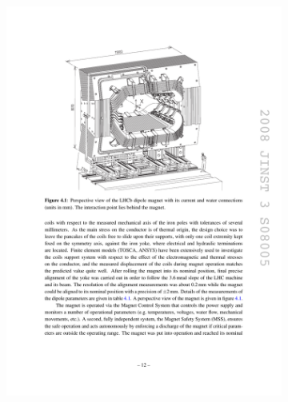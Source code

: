 \begin{figure}[!h]
    \centering
    \begin{subfigure}[t]{0.4\textwidth}
        \centering
        \includegraphics[width=1.0\textwidth]{figs/Detector/magnet_schematic.pdf}
    \end{subfigure}
    \begin{subfigure}[t]{0.4\textwidth}
        \centering

\end{subfigure}
\end{figure}
